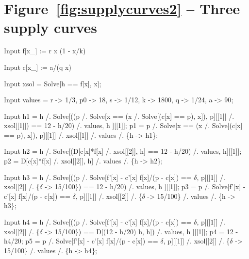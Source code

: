 \documentclass[11pt,fleqn]{book} %
\begin{document}
\section*{Figure~\ref{fig:supplycurves2} -- Three supply curves }
\small{
\begin{mmaCell}[index=1]{Input}
   f[x_] := r x (1 - x/k)
\end{mmaCell}

\begin{mmaCell}{Input}
   c[x_] := a/(q x)
\end{mmaCell}

\begin{mmaCell}{Input}
   xsol = Solve[h == f[x], x];
\end{mmaCell}

\begin{mmaCell}{Input}
   values = {r -> 1/3, p0 -> 18, s -> 1/12, k -> 1800, q -> 1/24, a -> 90};
\end{mmaCell}

\begin{mmaCell}{Input}
   h1 = h /. Solve[((p /. Solve[x == (x /. 
          Solve[(c[x] == p), x]), p][[1]] /.
          xsol[[1]]) == 12 - h/20) /. values, h
        ][[1]];
   p1 = p /. Solve[x == (x /. Solve[(c[x] == p), x]), p][[1]] /. 
        xsol[[1]] /. values /. \{h -> h1\};
\end{mmaCell}

\begin{mmaCell}[index=7]{Input}
   h2 = h /. Solve[(D[c[x]*f[x] /. xsol[[2]], h] == 12 - h/20) /. values, h][[1]];
   p2 = D[c[x]*f[x] /. xsol[[2]], h] /. values /. \{h -> h2\};
\end{mmaCell}

\begin{mmaCell}[index=9]{Input}
   h3 = h /. Solve[((p /. 
          Solve[f'[x] - c'[x] f[x]/(p - c[x]) == \(\delta\), p][[1]] /.
          xsol[[2]] /. \{\(\delta\) -> 15/100\}) == 12 - h/20) /. values, h
        ][[1]];
   p3 = p /. Solve[f'[x] - c'[x] f[x]/(p - c[x]) == \(\delta\), p][[1]] /.
        xsol[[2]] /. \{\(\delta\) -> 15/100\} /. values /. \{h -> h3\};
\end{mmaCell}

\begin{mmaCell}[index=11]{Input}
   h4 = h /. Solve[((p /. 
          Solve[f'[x] - c'[x] f[x]/(p - c[x]) == \(\delta\), p][[1]] /.
          xsol[[2]] /. \{\(\delta\) -> 15/100\}) == D[(12 - h/20) h, h]) /. values, h
        ][[1]];
   p4 = 12 - h4/20;
   p5 = p /. Solve[f'[x] - c'[x] f[x]/(p - c[x]) == \(\delta\), p][[1]] /. 
        xsol[[2]] /. \{\(\delta\) -> 15/100\} /. values /. \{h -> h4\};
\end{mmaCell}

}
\end{document}
